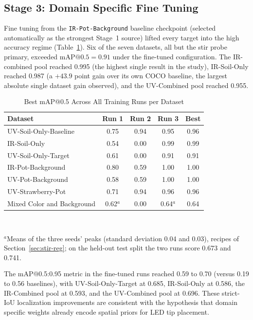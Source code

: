 ﻿\documentclass[journal]{IEEEtran}
\begin{document}
\subsection{Stage 3: Domain Specific Fine Tuning}
Fine tuning from the \texttt{IR-Pot-Background} baseline checkpoint (selected automatically as the strongest Stage~1 source) lifted every target into the high accuracy regime (Table~\ref{tab:best}). Six of the seven datasets, all but the stir probe primary, exceeded $\text{mAP@0.5}=0.91$ under the fine-tuned configuration. The IR-combined pool reached 0.995 (the highest single result in the study), IR-Soil-Only reached 0.987 (a $+43.9$ point gain over its own COCO baseline, the largest absolute single dataset gain observed), and the UV-Combined pool reached 0.955.

\begin{table}[!t]
\renewcommand{\arraystretch}{1.3}
\caption{Best mAP@0.5 Across All Training Runs per Dataset}
\label{tab:best}
\centering
\begin{tabular}{l c c c c}
\toprule
\textbf{Dataset} & \textbf{Run 1} & \textbf{Run 2} & \textbf{Run 3} & \textbf{Best} \\
\midrule
UV-Soil-Only-Baseline & 0.75 & 0.94 & 0.95 & 0.96 \\
IR-Soil-Only & 0.54 & 0.00 & 0.99 & 0.99 \\
UV-Soil-Only-Target & 0.61 & 0.00 & 0.91 & 0.91 \\
IR-Pot-Background & 0.80 & 0.59 & 1.00 & 1.00 \\
UV-Pot-Background & 0.58 & 0.59 & 1.00 & 1.00 \\
UV-Strawberry-Pot & 0.71 & 0.94 & 0.96 & 0.96 \\
Mixed Color and Background & 0.62$^{a}$ & 0.00 & 0.64$^{a}$ & 0.64 \\
\bottomrule
\end{tabular}
\\[2pt]
\parbox{\columnwidth}{\footnotesize $^{a}$Means of the three seeds' peaks (standard deviation 0.04 and 0.03), recipes of Section~\ref{sec:stir-reg}; on the held-out test split the two runs score 0.673 and 0.741.}
\end{table}

The mAP@0.5:0.95 metric in the fine-tuned runs reached 0.59 to 0.70 (versus 0.19 to 0.56 baselines), with UV-Soil-Only-Target at 0.685, IR-Soil-Only at 0.586, the IR-Combined pool at 0.593, and the UV-Combined pool at 0.696. These strict-IoU localization improvements are consistent with the hypothesis that domain specific weights already encode spatial priors for LED tip placement.
\end{document}
